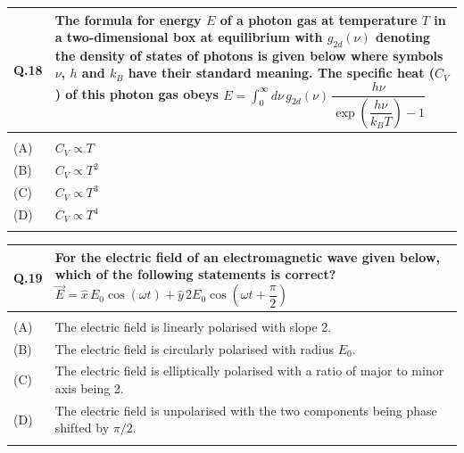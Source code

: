 \documentclass[12pt,a4paper]{article}
\begin{document}
\newpage

\begin{tabular}{|p{1cm}|p{12cm}|}
\hline
Q.18 & The formula for energy $E$ of a photon gas at temperature $T$ in a two-dimensional box at
equilibrium with $g_{2d}(\nu)$ denoting the density of states of photons is given below where
symbols $\nu$, $h$ and $k_B$ have their standard meaning. The specific heat ($C_V$) of this photon
gas obeys
$E = \int_0^{\infty} d\nu\, g_{2d}(\nu)\, \dfrac{h\nu}{\exp\!\left(\dfrac{h\nu}{k_B T}\right) - 1}$ \\
\hline
& \rule{0pt}{0.8cm} \\
\hline
(A) & $C_V \propto T$ \\
\hline
(B) & $C_V \propto T^2$ \\
\hline
(C) & $C_V \propto T^3$ \\
\hline
(D) & $C_V \propto T^4$ \\
\hline
& \rule{0pt}{0.8cm} \\
\hline
\end{tabular}

\vspace{1em}

\begin{tabular}{|p{1cm}|p{12cm}|}
\hline
Q.19 & For the electric field of an electromagnetic wave given below, which of the following
statements is correct?
$\vec{E} = \hat{x}\, E_0 \cos(\omega t) + \hat{y}\, 2E_0 \cos\!\left(\omega t + \dfrac{\pi}{2}\right)$ \\
\hline
& \rule{0pt}{0.8cm} \\
\hline
(A) & The electric field is linearly polarised with slope 2. \\
\hline
(B) & The electric field is circularly polarised with radius $E_0$. \\
\hline
(C) & The electric field is elliptically polarised with a ratio of major to minor axis being 2. \\
\hline
(D) & The electric field is unpolarised with the two components being phase shifted by $\pi/2$. \\
\hline
& \rule{0pt}{0.8cm} \\
\hline
\end{tabular}

\newpage
\end{document}
